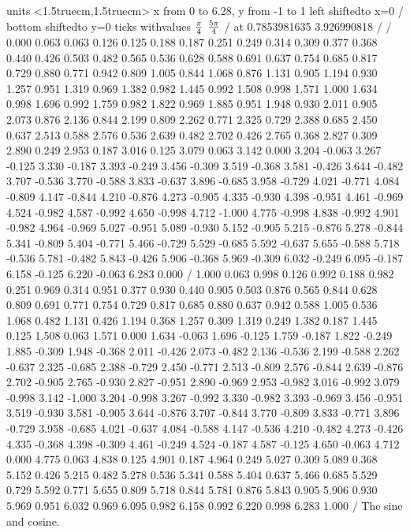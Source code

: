 \figure
\texonly
\vbox{\beginpicture
\normalgraphs
\ninepoint
\setcoordinatesystem units <1.5truecm,1.5truecm>
\setplotarea x from 0 to 6.28, y from -1 to 1
\axis left shiftedto x=0 /
\axis bottom shiftedto y=0 ticks withvalues {${\pi\over4}$}
      {$5\pi\over4$} / at 0.7853981635 3.926990818 / /
\setquadratic
{} 0.000 
0.063 0.063 0.126 0.125 0.188 0.187 0.251 0.249 
0.314 0.309 0.377 0.368 0.440 0.426 0.503 0.482 0.565 0.536 
0.628 0.588 0.691 0.637 0.754 0.685 0.817 0.729 0.880 0.771 
0.942 0.809 1.005 0.844 1.068 0.876 1.131 0.905 1.194 0.930 
1.257 0.951 1.319 0.969 1.382 0.982 1.445 0.992 1.508 0.998 
1.571 1.000 1.634 0.998 1.696 0.992 1.759 0.982 1.822 0.969 
1.885 0.951 1.948 0.930 2.011 0.905 2.073 0.876 2.136 0.844 
2.199 0.809 2.262 0.771 2.325 0.729 2.388 0.685 2.450 0.637 
2.513 0.588 2.576 0.536 2.639 0.482 2.702 0.426 2.765 0.368 
2.827 0.309 2.890 0.249 2.953 0.187 3.016 0.125 3.079 0.063 
3.142 0.000 3.204 -0.063 3.267 -0.125 3.330 -0.187 3.393 -0.249 
3.456 -0.309 3.519 -0.368 3.581 -0.426 3.644 -0.482 3.707 -0.536 
3.770 -0.588 3.833 -0.637 3.896 -0.685 3.958 -0.729 4.021 -0.771 
4.084 -0.809 4.147 -0.844 4.210 -0.876 4.273 -0.905 4.335 -0.930 
4.398 -0.951 4.461 -0.969 4.524 -0.982 4.587 -0.992 4.650 -0.998 
4.712 -1.000 4.775 -0.998 4.838 -0.992 4.901 -0.982 4.964 -0.969 
5.027 -0.951 5.089 -0.930 5.152 -0.905 5.215 -0.876 5.278 -0.844 
5.341 -0.809 5.404 -0.771 5.466 -0.729 5.529 -0.685 5.592 -0.637 
5.655 -0.588 5.718 -0.536 5.781 -0.482 5.843 -0.426 5.906 -0.368 
5.969 -0.309 6.032 -0.249 6.095 -0.187 6.158 -0.125 6.220 -0.063 
6.283 0.000 /
 1.000 0.063 0.998 0.126 0.992 0.188 0.982 0.251 0.969 
0.314 0.951 0.377 0.930 0.440 0.905 0.503 0.876 0.565 0.844 
0.628 0.809 0.691 0.771 0.754 0.729 0.817 0.685 0.880 0.637 
0.942 0.588 1.005 0.536 1.068 0.482 1.131 0.426 1.194 0.368 
1.257 0.309 1.319 0.249 1.382 0.187 1.445 0.125 1.508 0.063 
1.571 0.000 1.634 -0.063 1.696 -0.125 1.759 -0.187 1.822 -0.249 
1.885 -0.309 1.948 -0.368 2.011 -0.426 2.073 -0.482 2.136 -0.536 
2.199 -0.588 2.262 -0.637 2.325 -0.685 2.388 -0.729 2.450 -0.771 
2.513 -0.809 2.576 -0.844 2.639 -0.876 2.702 -0.905 2.765 -0.930 
2.827 -0.951 2.890 -0.969 2.953 -0.982 3.016 -0.992 3.079 -0.998 
3.142 -1.000 3.204 -0.998 3.267 -0.992 3.330 -0.982 3.393 -0.969 
3.456 -0.951 3.519 -0.930 3.581 -0.905 3.644 -0.876 3.707 -0.844 
3.770 -0.809 3.833 -0.771 3.896 -0.729 3.958 -0.685 4.021 -0.637 
4.084 -0.588 4.147 -0.536 4.210 -0.482 4.273 -0.426 4.335 -0.368 
4.398 -0.309 4.461 -0.249 4.524 -0.187 4.587 -0.125 4.650 -0.063 
4.712 0.000 4.775 0.063 4.838 0.125 4.901 0.187 4.964 0.249 
5.027 0.309 5.089 0.368 5.152 0.426 5.215 0.482 5.278 0.536 
5.341 0.588 5.404 0.637 5.466 0.685 5.529 0.729 5.592 0.771 
5.655 0.809 5.718 0.844 5.781 0.876 5.843 0.905 5.906 0.930 
5.969 0.951 6.032 0.969 6.095 0.982 6.158 0.992 6.220 0.998 
6.283 1.000 /
\endpicture}
\endtexonly
{}
\begincaption
The sine and cosine.
\endcaption
\endfigure

